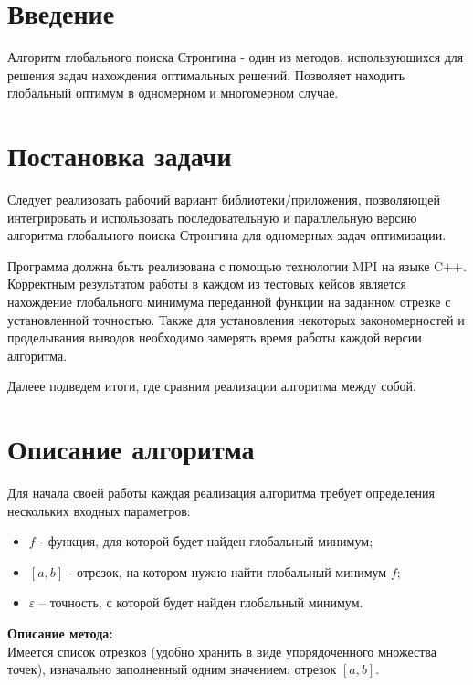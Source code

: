 \documentclass[14pt, a4paper]{extarticle}
\begin{document}
	\pagestyle{plain}
	\setcounter{page}{3}

	\section{Введение}
	Алгоритм глобального поиска Стронгина - один из методов, использующихся для решения задач нахождения оптимальных решений. Позволяет находить глобальный оптимум в одномерном и многомерном случае.
	\newpage

	\section{Постановка задачи}
	Следует реализовать рабочий вариант библиотеки/приложения, позволяющей интегрировать и использовать последовательную и параллельную версию алгоритма глобального поиска Стронгина для одномерных задач оптимизации.

	Программа должна быть реализована с помощью технологии MPI на языке C++. Корректным результатом работы в каждом из тестовых кейсов является нахождение глобального минимума переданной функции на заданном отрезке с установленной точностью. Также для установления некоторых закономерностей и проделывания выводов необходимо замерять время работы каждой версии алгоритма.

	Далеее подведем итоги, где сравним реализации алгоритма между собой.
	\newpage

	\section{Описание алгоритма}
	Для начала своей работы каждая реализация алгоритма требует определения нескольких входных параметров:
	\begin{itemize}
		\item $f$ - функция, для которой будет найден глобальный минимум;
		\item $[a,b]$ - отрезок, на котором нужно найти глобальный минимум $f$;
		\item $\varepsilon$ – точность, с которой будет найден глобальный минимум.
	\end{itemize}

	\textbf{Описание метода:}\\
	Имеется список отрезков (удобно хранить в виде упорядоченного множества точек), изначально заполненный одним значением: отрезок $[a,b]$.
\end{document}
